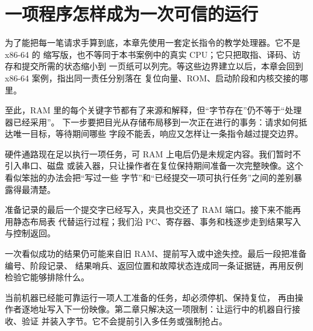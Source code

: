 \chapter{一项程序怎样成为一次可信的运行}



为了能把每一笔请求手算到底，本章先使用一套定长指令的教学处理器。它不是 x86-64 的
缩写版，也不等同于本书案例中的真实 CPU；它只把取指、译码、访存和提交所需的状态缩小到
一页纸可以列完。等这些边界建立以后，本章会回到 x86-64 案例，指出同一责任分别落在
复位向量、ROM、启动阶段和内核交接的哪里。







至此，RAM 里的每个关键字节都有了来源和解释，但“字节存在”仍不等于“处理器已经采用”。
下一步要把目光从存储布局移到一次正在进行的事务：请求如何抵达唯一目标，等待期间哪些
字段不能丢，响应又怎样让一条指令越过提交边界。






硬件通路现在足以执行一项任务，可 RAM 上电后仍是未规定内容。我们暂时不引入串口、磁盘
或装入器，只让操作者在复位保持期间准备一次完整映像。这个看似笨拙的办法会把“写过一些
字节”和“已经提交一项可执行任务”之间的差别暴露得最清楚。




准备记录的最后一个提交字已经写入，夹具也交还了 RAM 端口。接下来不能再用静态布局表
代替运行过程；我们沿 PC、寄存器、事务和栈逐步走到结果写入与控制返回。



一次看似成功的结果仍可能来自旧 RAM、提前写入或中途失控。最后一段把准备编号、阶段记录、
结果哨兵、返回位置和故障状态连成同一条证据链，再用反例检验它能够排除什么。






当前机器已经能可靠运行一项人工准备的任务，却必须停机、保持复位，
再由操作者逐地址写入下一份映像。第二章只解决这一项限制：让运行中的机器自行接收、验证
并装入字节。它不会提前引入多任务或强制抢占。
